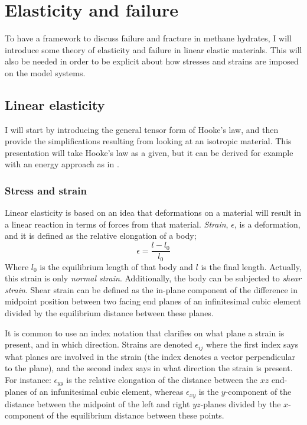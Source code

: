  \chapter{Elasticity and failure}
 To have a framework to discuss failure and fracture in methane hydrates, I will introduce some theory of elasticity and failure in linear elastic materials. This will also be needed in order to be explicit about how stresses and strains are imposed on the model systems.

 \section{Linear elasticity}
I will start by introducing the general tensor form of Hooke's law, and then provide the simplifications resulting from looking at an isotropic material. This presentation will take Hooke's law as a given, but it can be derived for example with an energy approach as in \citet[p.105]{Buehler2008}.

\subsection{Stress and strain}
Linear elasticity is based on an idea that deformations on a material will result in a linear reaction in terms of forces from that material. \emph{Strain}, $\epsilon$, is a deformation, and it is defined as the relative elongation of a body;
\begin{equation}
	\epsilon = \frac{l-l_0}{l_0}
\end{equation}
Where $l_0$ is the equilibrium length of that body and $l$ is the final length. Actually, this strain is only \emph{normal strain}. Additionally, the body can be subjected to \emph{shear strain}. Shear strain can be defined as the in-plane component of the difference in midpoint position between two facing end planes of an infinitesimal cubic element divided by the equilibrium distance between these planes.

It is common to use an index notation that clarifies on what plane a strain is present, and in which direction. Strains are denoted $\epsilon_{ij}$ where the first index says what planes are involved in the strain (the index denotes a vector perpendicular to the plane), and the second index says in what direction the strain is present. For instance: $\epsilon_{yy}$ is the relative elongation of the distance between the $xz$ end-planes of an infunitesimal cubic element, whereas $\epsilon_{xy}$ is the $y$-component of the distance between the midpoint of the left and right $yz$-planes divided by the $x$-component of the equilibrium distance between these points.

